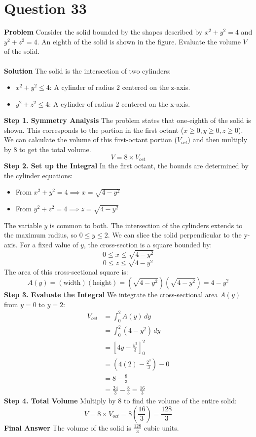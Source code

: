 \documentclass{article}
\begin{document}
\section{Question 33}
\textbf{Problem}
Consider the solid bounded by the shapes described by $x^2+y^2=4$ and
$y^2+z^2=4$. An eighth of the solid is shown in the figure. Evaluate the volume
$V$ of the solid.
\\
\\
\textbf{Solution}
The solid is the intersection of two cylinders:
\begin{itemize}
	\item $x^2 + y^2 \le 4$: A cylinder of radius $2$ centered on the z-axis.
	\item $y^2 + z^2 \le 4$: A cylinder of radius $2$ centered on the x-axis.
\end{itemize}
\textbf{Step 1. Symmetry Analysis}
The problem states that one-eighth of the solid is shown. This corresponds to
the portion in the first octant ($x \ge 0, y \ge 0, z \ge 0$). We can calculate
the volume of this first-octant portion ($V_{oct}$) and then multiply by 8 to
get the total volume.
\[ V = 8 \times V_{oct} \]
\textbf{Step 2. Set up the Integral}
In the first octant, the bounds are determined by the cylinder equations:
\begin{itemize}
	\item From $x^2 + y^2 = 4 \implies x = \sqrt{4 - y^2}$
	\item From $y^2 + z^2 = 4 \implies z = \sqrt{4 - y^2}$
\end{itemize}
The variable $y$ is common to both. The intersection of the cylinders extends to
the maximum radius, so $0 \le y \le 2$. We can slice the solid perpendicular to
the y-axis. For a fixed value of $y$, the cross-section is a square bounded by:
\[ 0 \le x \le \sqrt{4-y^2} \]
\[ 0 \le z \le \sqrt{4-y^2} \]
The area of this cross-sectional square is:
\[ A(y) = (\text{width})(\text{height}) = (\sqrt{4-y^2})(\sqrt{4-y^2}) = 4 - y^2 \]
\textbf{Step 3. Evaluate the Integral}
We integrate the cross-sectional area $A(y)$ from $y=0$ to $y=2$:
\begin{align*}
	V_{oct} & = \int_0^2 A(y) \, dy                       \\
	        & = \int_0^2 (4 - y^2) \, dy                  \\
	        & = \left[ 4y - \frac{y^3}{3} \right]_0^2     \\
	        & = \left( 4(2) - \frac{2^3}{3} \right) - 0   \\
	        & = 8 - \frac{8}{3}                           \\
	        & = \frac{24}{3} - \frac{8}{3} = \frac{16}{3}
\end{align*}
\textbf{Step 4. Total Volume}
Multiply by 8 to find the volume of the entire solid:
\[
	V = 8 \times V_{oct} = 8 \left( \frac{16}{3} \right) = \frac{128}{3}
\]
\textbf{Final Answer} The volume of the solid is $\frac{128}{3}$ cubic units.
\end{document}
